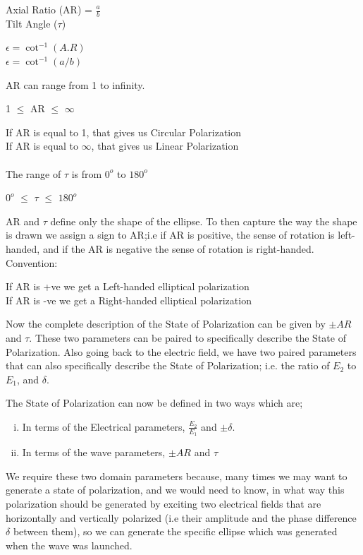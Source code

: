 \begin{center}
Axial Ratio (AR) = $\frac{a}{b}$\\
Tilt Angle ($\tau$)

$\epsilon  =  \cot^{-1}(A.R)$\\
$\epsilon  =  \cot^{-1}(a/b)$\\
\end{center}
AR can range from 1 to infinity.\begin{center}
1 $\leq $ AR $\leq $ $\infty $
\end{center}
If AR is equal to 1, that gives us Circular Polarization\\
If AR is equal to $\infty$, that gives us Linear Polarization\\
\\
The range of $\tau $ is from $0^{o}$ to $180^{o}$ 
\begin{center}
$0^{o}$ $\leq $ $\tau $ $\leq $ $180^{o} $
\end{center}
AR and $\tau $ define only the shape of the ellipse. To then capture the way the shape is drawn we assign a sign to AR;i.e if AR is positive, the sense of rotation is left-handed, and if the AR is negative the sense of rotation is right-handed.\\
Convention:
\begin{center}
If AR is +ve we get a Left-handed elliptical polarization\\
If AR is -ve we get a Right-handed elliptical polarization
\end{center}
Now the complete description of the State of Polarization can be given by $\pm AR$ and $\tau $. These two parameters can be paired to specifically describe the State of Polarization. Also going back to the electric field, we have two paired parameters that can also specifically describe the State of Polarization; i.e. the ratio of $ E_2 $ to $ E_1 $, and $\delta$.

The State of Polarization can now be defined in two ways which are;
\begin{enumerate}[(i)]
\item In terms of the Electrical parameters, $\frac{E_2}{E_1}$ and $\pm \delta $.
\item In terms of the wave parameters, $\pm AR $ and $\tau $
\end{enumerate}
We require these two domain parameters because, many times we may want to generate a state of polarization, and we would need to know, in what way this polarization should be generated by exciting two electrical fields that are horizontally and vertically polarized (i.e their amplitude and the phase difference $\delta $ between them), so we can generate the specific ellipse which was generated when the wave was launched.

